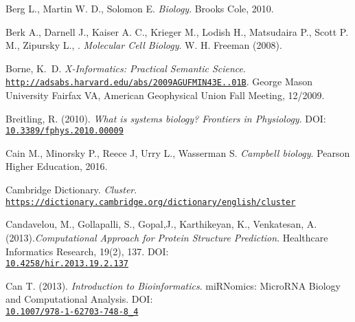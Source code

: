 \documentclass[twoside,openright,titlepage,fleqn,
,	headinclude,12pt,a4paper,BCOR5mm,footinclude,table]{scrbook}
\newcommand{\?}{'\-\nobreak\hspace{0pt}}
\begin{document}
\begin{thebibliography}{60}
Berg L., Martin W. D., Solomon E. \newline
\textit{Biology}.\newline
Brooks Cole, 2010.

Berk A., Darnell J., Kaiser A. C., Krieger M., Lodish H., Matsudaira P., Scott P. M., Zipursky L., . \newline
\textit{Molecular Cell Biology}.\newline
W. H. Freeman (2008).

Borne, K.~D.\newline
\textit{X-Informatics: Practical Semantic Science}.
\\\texttt{\url{http://adsabs.harvard.edu/abs/2009AGUFMIN43E..01B}}. \newline
George Mason University Fairfax VA, American Geophysical Union Fall Meeting, 12/2009.

Breitling, R. (2010). \newline
\textit{What is systems biology? Frontiers in Physiology}.\newline
DOI: \\\texttt{\url{10.3389/fphys.2010.00009}}

Cain M., Minorsky P., Reece J, Urry L., Wasserman S. \newline
\textit{Campbell biology}. \newline
Pearson Higher Education, 2016.

Cambridge Dictionary. \newline
\textit{Cluster}.
\\\texttt{\url{https://dictionary.cambridge.org/dictionary/english/cluster}}

Candavelou, M., Gollapalli, S., Gopal,J., Karthikeyan, K., Venkatesan, A.(2013).\newline \textit{Computational Approach for Protein Structure Prediction}.\newline
Healthcare Informatics Research, 19(2), 137. \newline
DOI: \\\texttt{\url{10.4258/hir.2013.19.2.137}}

Can T. (2013).\newline
\textit{Introduction to Bioinformatics}.\newline
miRNomics: MicroRNA Biology and Computational Analysis.\newline
DOI: \\\texttt{\url{10.1007/978-1-62703-748-8_4}}


\end{thebibliography}
\end{document}

